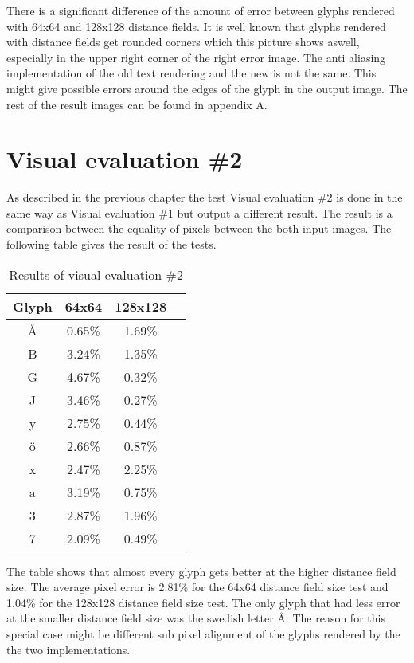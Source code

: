 There is a significant difference of the amount of error between glyphs rendered with 64x64 and 128x128 distance fields. It is well known that glyphs rendered with distance fields get rounded corners which this picture shows aswell, especially in the upper right corner of the right error image. The anti aliasing implementation of the old text rendering and the new is not the same. This might give possible errors around the edges of the glyph in the output image. The rest of the result images can be found in appendix A. 

\section{Visual evaluation \#2}
As described in the previous chapter the test Visual evaluation \#2 is done in the same way as Visual evaluation \#1 but output a different result. The result is a comparison between the equality of pixels between the both input images. The following table gives the result of the tests. 
\begin{table}[H]
\caption{Results of visual evaluation \#2}
\centering
\begin{tabular}{c c c c}
\hline
\hline %
Glyph & 64x64 & 128x128\\ [0.5ex] %
\hline
Å & 0.65\% & 1.69\% \\
B & 3.24\% & 1.35\% \\
G & 4.67\% & 0.32\% \\
J & 3.46\% & 0.27\% \\
y & 2.75\% & 0.44\% \\ 
ö & 2.66\% & 0.87\% \\
x & 2.47\% & 2.25\% \\
a & 3.19\% & 0.75\% \\
3 & 2.87\% & 1.96\% \\
7 & 2.09\% & 0.49\% \\ [1ex]
\hline
\end{tabular}
\label{table:nonlin}
\end{table}

The table shows that almost every glyph gets better at the higher distance field size. The average pixel error is 2.81\% for the 64x64 distance field size test and 1.04\% for the 128x128 distance field size test. The only glyph that had less error at the smaller distance field size was the swedish letter Å. The reason for this special case might be different sub pixel alignment of the glyphs rendered by the the two implementations.
